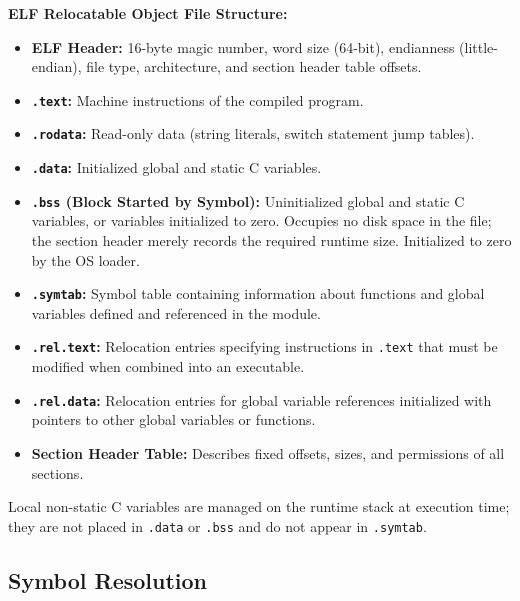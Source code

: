 \begin{definition}
    \textbf{ELF Relocatable Object File Structure:}
    \begin{itemize}
        \item \textbf{ELF Header:} 16-byte magic number, word size (64-bit), endianness (little-endian), file type, architecture, and section header table offsets.
        \item \textbf{\texttt{.text}:} Machine instructions of the compiled program.
        \item \textbf{\texttt{.rodata}:} Read-only data (string literals, switch statement jump tables).
        \item \textbf{\texttt{.data}:} Initialized global and static C variables.
        \item \textbf{\texttt{.bss} (Block Started by Symbol):} Uninitialized global and static C variables, or variables initialized to zero. Occupies no disk space in the file; the section header merely records the required runtime size. Initialized to zero by the OS loader.
        \item \textbf{\texttt{.symtab}:} Symbol table containing information about functions and global variables defined and referenced in the module.
        \item \textbf{\texttt{.rel.text}:} Relocation entries specifying instructions in \texttt{.text} that must be modified when combined into an executable.
        \item \textbf{\texttt{.rel.data}:} Relocation entries for global variable references initialized with pointers to other global variables or functions.
        \item \textbf{Section Header Table:} Describes fixed offsets, sizes, and permissions of all sections.
    \end{itemize}
\end{definition}

\begin{important}
    Local non-static C variables are managed on the runtime stack at execution time; they are not placed in \texttt{.data} or \texttt{.bss} and do not appear in \texttt{.symtab}.
\end{important}

\subsection{Symbol Resolution}

